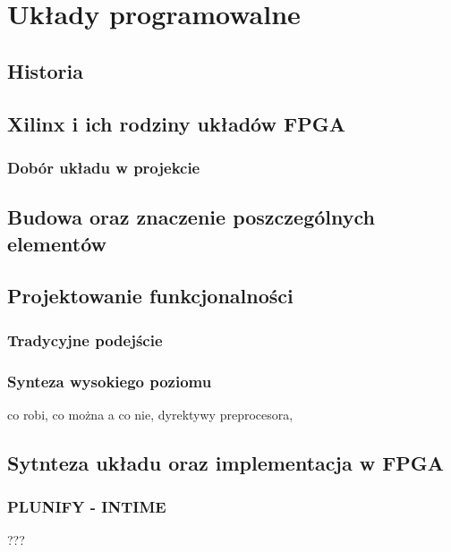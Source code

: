 \chapter{Układy programowalne}

\section{Historia}

\section{Xilinx i ich rodziny układów FPGA}
\subsection{Dobór układu w projekcie}

\section{Budowa oraz znaczenie poszczególnych elementów}

\section{Projektowanie funkcjonalności}
\subsection{Tradycyjne podejście}
\subsection{Synteza wysokiego poziomu}
co robi, co można a co nie, dyrektywy preprocesora,

\section{Sytnteza układu oraz implementacja w FPGA}
\subsection{PLUNIFY - INTIME}
???

